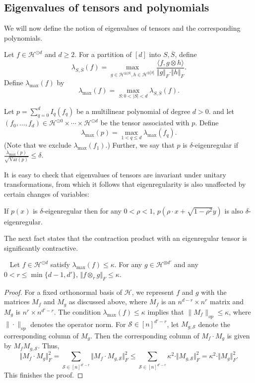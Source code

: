 \documentclass{toc}
\newcommand{\Var}{\mathrm{Var}}
\begin{document}
\subsection{Eigenvalues of tensors and polynomials}
We will now define the notion of eigenvalues of tensors and the corresponding polynomials. 
\begin{definition}
Let $f \in \mathcal{H}^{\odot d}$ and $d \ge 2$. For a partition of $[d]$ into $S, \overline{S}$, define
$$
\lambda_{S, \overline{S}}(f) = \max_{g \in \mathcal{H}^{\otimes |S|}, h \in \mathcal{H}^{\otimes |\overline{S}|}} \frac{\langle f, g \otimes h \rangle}{\Vert g \Vert_F \cdot \Vert h \Vert_F}.
$$
Define $\lambda_{\max}(f)$ by
$$
\lambda_{\max}(f) = \max_{S: 0< |S|< d} \lambda_{S, \overline{S}} (f). 
$$
\end{definition}

\begin{definition}\label{def:eigen-tensor}
    Let $p = \sum_{q=0}^d I_q(f_q)$ be a multilinear polynomial of
degree $d>0$.  and let $(f_0, \ldots, f_d) \in \mathcal{H}^{\odot 0} \times
\cdots \times \mathcal{H}^{\odot d}$ be the tensor associated with $p$. Define
$$
\lambda_{\max}(p)  = \max_{1 < q \le d} \lambda_{\max}(f_q). 
$$
(Note that we exclude $\lambda_{\max}(f_1)$.)
Further, we say that $p$ is $\delta$-eigenregular if $\frac{\lambda_{\max}(p)}{\sqrt{\Var(p)}} \le \delta$. 
\end{definition}

It is easy to check that eigenvalues of tensors are invariant under unitary transformations, from which it follows that
eigenregularity is also unaffected by certain changes of variables:
\begin{fact}
If $p(x)$ is $\delta$-eigenregular then for any $0 < \rho < 1$,  $p(\rho \cdot x + \sqrt{1-\rho^2} y)$ is also $\delta$-eigenregular. 
\end{fact}
The next fact states that the contraction product with an eigenregular tensor is significantly contractive. 
\begin{fact}~\label{fact:contraction1}
Let $f \in \mathcal{H}^{\odot d}$  satisfy $\lambda_{\max} (f) \le \kappa$. For any $g \in \mathcal{H}^{\otimes d'}$ and any $0< r \le \min \{ d-1,d' \}$, 
$\Vert f \otimes_r g \Vert_F \le \kappa$. 
\end{fact}
\begin{proof}
    For a fixed orthonormal basis of $\mathcal{H}$, we represent $f$ and $g$
    with the matrices $M_f$ and $M_g$ as discussed above, where $M_f$ is an
    $n^{d-r} \times n^{r}$ matrix and $M_g$ is $n^r \times n^{d'-r}$.
    The condition $\lambda_{\max}(f) \le \kappa$ implies that $\|M_f\|_{op} \le \kappa$,
    where $\|\cdot\|_{op}$ denotes the operator norm.
For
$\mathcal{S} \in [n]^{d'-r}$, let $M_{g, \mathcal{S}}$ denote the
corresponding column of $M_{g}$. Then the corresponding column of
$M_f \cdot M_g$ is given by $M_f M_{g, \mathcal{S}}$. Thus, 
\[
\Vert M_f \cdot M_g \Vert_F^2  = \sum_{\mathcal{S} \in [n]^{d'-r}} \Vert M_f \cdot  M_{g, \mathcal{S}} \Vert_F^2 \le \sum_{\mathcal{S} \in [n]^{d'-r}} \kappa^2 \cdot \Vert M_{g, \mathcal{S}} \Vert_F^2 = \kappa^2 \cdot \Vert M_g \Vert_F^2.
\]
This finishes the proof. 
\end{proof}
\end{document}
